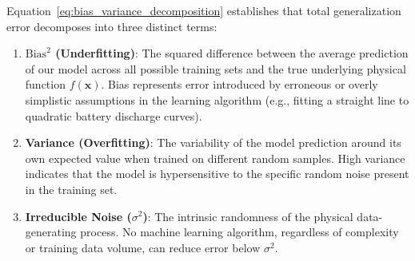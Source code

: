 Equation~\eqref{eq:bias_variance_decomposition} establishes that total generalization error decomposes into three distinct terms:
\begin{enumerate}
    \item \textbf{$\text{Bias}^2$ (Underfitting)}: The squared difference between the average prediction of our model across all possible training sets and the true underlying physical function $f(\mathbf{x})$. Bias represents error introduced by erroneous or overly simplistic assumptions in the learning algorithm (e.g., fitting a straight line to quadratic battery discharge curves).
    \item \textbf{Variance (Overfitting)}: The variability of the model prediction around its own expected value when trained on different random samples. High variance indicates that the model is hypersensitive to the specific random noise present in the training set.
    \item \textbf{Irreducible Noise ($\sigma^2$)}: The intrinsic randomness of the physical data-generating process. No machine learning algorithm, regardless of complexity or training data volume, can reduce error below $\sigma^2$.
\end{enumerate}

